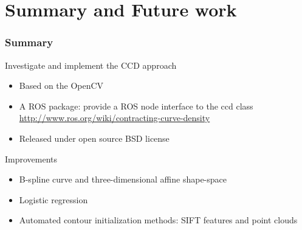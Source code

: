 \documentclass[english,10pt,presentation]{beamer}
\begin{document}
\section{Summary and Future work}
\label{sec-6}
\begin{frame}
\frametitle{Summary}
\label{sec-6_1}
\begin{block}{Investigate and implement the CCD approach}
\label{sec-6_1_1}
\begin{itemize}

\item Based on the OpenCV\\
\label{sec-6_1_1_1}%
\item A ROS package: provide a ROS node interface to the ccd class\\
\label{sec-6_1_1_2}%
\url{http://www.ros.org/wiki/contracting-curve-density}

\item Released under open source BSD license\\
\label{sec-6_1_1_3}%
\end{itemize} %
\end{block}
\begin{block}{Improvements}
\label{sec-6_1_2}
\begin{itemize}

\item B-spline curve and three-dimensional affine shape-space\\
\label{sec-6_1_2_1}%
\item Logistic regression\\
\label{sec-6_1_2_2}%
\item Automated contour initialization methods: SIFT features and point clouds\\
\label{sec-6_1_2_3}%
\end{itemize} %
\end{block}
\end{frame}
\end{document}
